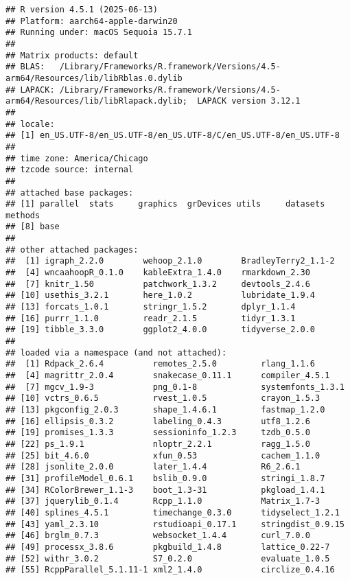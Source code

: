 \documentclass[
]{article}
\begin{document}
\begin{verbatim}
## R version 4.5.1 (2025-06-13)
## Platform: aarch64-apple-darwin20
## Running under: macOS Sequoia 15.7.1
## 
## Matrix products: default
## BLAS:   /Library/Frameworks/R.framework/Versions/4.5-arm64/Resources/lib/libRblas.0.dylib 
## LAPACK: /Library/Frameworks/R.framework/Versions/4.5-arm64/Resources/lib/libRlapack.dylib;  LAPACK version 3.12.1
## 
## locale:
## [1] en_US.UTF-8/en_US.UTF-8/en_US.UTF-8/C/en_US.UTF-8/en_US.UTF-8
## 
## time zone: America/Chicago
## tzcode source: internal
## 
## attached base packages:
## [1] parallel  stats     graphics  grDevices utils     datasets  methods  
## [8] base     
## 
## other attached packages:
##  [1] igraph_2.2.0        wehoop_2.1.0        BradleyTerry2_1.1-2
##  [4] wncaahoopR_0.1.0    kableExtra_1.4.0    rmarkdown_2.30     
##  [7] knitr_1.50          patchwork_1.3.2     devtools_2.4.6     
## [10] usethis_3.2.1       here_1.0.2          lubridate_1.9.4    
## [13] forcats_1.0.1       stringr_1.5.2       dplyr_1.1.4        
## [16] purrr_1.1.0         readr_2.1.5         tidyr_1.3.1        
## [19] tibble_3.3.0        ggplot2_4.0.0       tidyverse_2.0.0    
## 
## loaded via a namespace (and not attached):
##  [1] Rdpack_2.6.4          remotes_2.5.0         rlang_1.1.6          
##  [4] magrittr_2.0.4        snakecase_0.11.1      compiler_4.5.1       
##  [7] mgcv_1.9-3            png_0.1-8             systemfonts_1.3.1    
## [10] vctrs_0.6.5           rvest_1.0.5           crayon_1.5.3         
## [13] pkgconfig_2.0.3       shape_1.4.6.1         fastmap_1.2.0        
## [16] ellipsis_0.3.2        labeling_0.4.3        utf8_1.2.6           
## [19] promises_1.3.3        sessioninfo_1.2.3     tzdb_0.5.0           
## [22] ps_1.9.1              nloptr_2.2.1          ragg_1.5.0           
## [25] bit_4.6.0             xfun_0.53             cachem_1.1.0         
## [28] jsonlite_2.0.0        later_1.4.4           R6_2.6.1             
## [31] profileModel_0.6.1    bslib_0.9.0           stringi_1.8.7        
## [34] RColorBrewer_1.1-3    boot_1.3-31           pkgload_1.4.1        
## [37] jquerylib_0.1.4       Rcpp_1.1.0            Matrix_1.7-3         
## [40] splines_4.5.1         timechange_0.3.0      tidyselect_1.2.1     
## [43] yaml_2.3.10           rstudioapi_0.17.1     stringdist_0.9.15    
## [46] brglm_0.7.3           websocket_1.4.4       curl_7.0.0           
## [49] processx_3.8.6        pkgbuild_1.4.8        lattice_0.22-7       
## [52] withr_3.0.2           S7_0.2.0              evaluate_1.0.5       
## [55] RcppParallel_5.1.11-1 xml2_1.4.0            circlize_0.4.16      

\end{verbatim}
\end{document}
